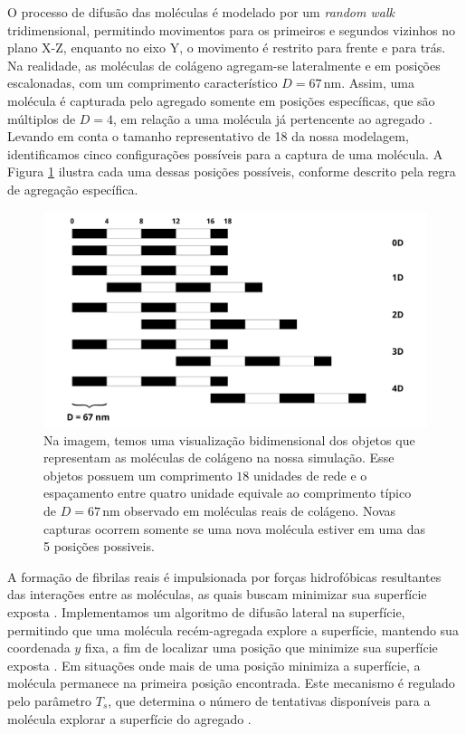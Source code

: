 \documentclass{article}
\begin{document}
        O processo de difusão das moléculas é modelado por um \textit{random walk} tridimensional, permitindo movimentos para os primeiros e 
        segundos vizinhos no plano X-Z, enquanto no eixo Y, o movimento é restrito para frente e para trás. Na realidade, as moléculas de colágeno 
        agregam-se lateralmente e em posições escalonadas, com um comprimento característico \(D = 67 \, \text{nm}\). Assim, uma molécula é 
        capturada pelo agregado somente em posições específicas, que são múltiplos de \(D = 4\), em relação a uma molécula já pertencente ao 
        agregado \cite{Parkinson1995}. Levando em conta o tamanho representativo de 18 da nossa modelagem, identificamos cinco configurações 
        possíveis para a captura de uma molécula. A Figura \ref{M2} ilustra cada uma dessas posições possíveis, conforme descrito pela regra de 
        agregação específica. 

        \begin{figure}[H]
            \centering
            \includegraphics[width=\textwidth]{figures/specific_bind.png}
            
            \caption{Na imagem, temos uma visualização bidimensional dos objetos que representam as moléculas de colágeno na nossa simulação. 
            Esse objetos possuem um comprimento \(18\) unidades de rede e o espaçamento entre quatro unidade equivale ao comprimento típico de
            \(D = 67 \, \text{nm}\) observado em moléculas reais de colágeno. Novas capturas ocorrem somente se uma nova molécula estiver em uma
            das 5 posições possiveis. }
            
    
            \label{M2}
        \end{figure}

        A formação de fibrilas reais é impulsionada por forças hidrofóbicas resultantes das interações entre as moléculas, as quais buscam 
        minimizar sua superfície exposta \cite{Kadler1987,Parkinson1995}. Implementamos um algoritmo de difusão lateral
        na superfície, permitindo que uma molécula recém-agregada explore a superfície, mantendo sua coordenada \(y\) fixa, a fim de localizar 
        uma posição que minimize sua superfície exposta \cite{GarcaRuiz1991}. Em situações onde mais de uma posição minimiza a superfície, a 
        molécula permanece na primeira posição encontrada. Este mecanismo é regulado pelo parâmetro \(T_{s}\), que determina o número de 
        tentativas disponíveis para a molécula explorar a superfície do agregado \cite{Parkinson1995}.
\end{document}
